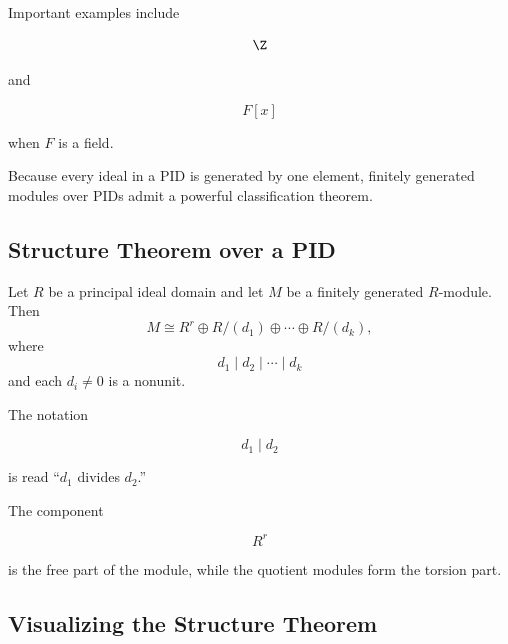 Important examples include

\[ \Z \]

and

\[ F[x] \]

when \(F\) is a field.

Because every ideal in a PID is generated by one element, finitely generated
modules over PIDs admit a powerful classification theorem.

\subsection{Structure Theorem over a PID}
\label{subsec:structure-theorem-pid}

\begin{theorem}
Let \(R\) be a principal ideal domain and let \(M\) be a finitely generated
\(R\)-module. Then
\[ M\cong R^r\oplus R/(d_1)\oplus\cdots\oplus R/(d_k), \]
where
\[ d_1\mid d_2\mid\cdots\mid d_k \]
and each \(d_i\neq0\) is a nonunit.
\end{theorem}

The notation

\[ d_1\mid d_2 \]

is read ``\(d_1\) divides \(d_2\).''

The component

\[ R^r \]

is the free part of the module, while the quotient modules form the torsion
part.

\subsection{Visualizing the Structure Theorem}
\label{subsec:structure-theorem-visual}

\begin{center}
\end{center}


